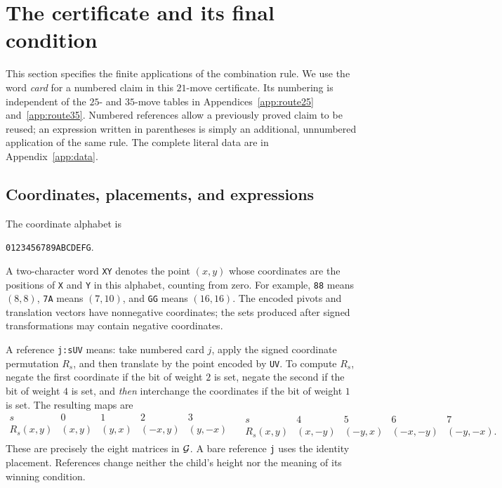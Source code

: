 \section{The certificate and its final condition}\label{sec:certificate}

This section specifies the finite applications of the combination
rule. We use the word \emph{card} for a numbered claim in this
$21$-move certificate. Its numbering is independent of the $25$- and
$35$-move tables in Appendices~\ref{app:route25} and~\ref{app:route35}. Numbered references allow a previously proved claim to
be reused; an expression written in parentheses is simply an
additional, unnumbered application of the same rule.
The complete literal data are in Appendix~\ref{app:data}.

\subsection{Coordinates, placements, and expressions}

The coordinate alphabet is
\begin{center}
\texttt{0123456789ABCDEFG}.
\end{center}
A two-character word \texttt{XY} denotes the point $(x,y)$ whose
coordinates are the positions of \texttt{X} and \texttt{Y} in this
alphabet, counting from zero. For example, \texttt{88} means $(8,8)$,
\texttt{7A} means $(7,10)$, and \texttt{GG} means $(16,16)$.
The encoded pivots and translation vectors have nonnegative
coordinates; the sets produced after signed transformations may
contain negative coordinates.

A reference \texttt{j:sUV} means: take numbered card $j$, apply the
signed coordinate permutation $R_s$, and then translate by the point
encoded by \texttt{UV}. To compute $R_s$, negate the first coordinate
if the bit of weight $2$ is set, negate the second if the bit of
weight $4$ is set, and \emph{then} interchange the coordinates if the
bit of weight $1$ is set. The resulting maps are
\begin{equation}\label{eq:symmetries}
\begin{array}{c|cccc}
 s&0&1&2&3\\ \hline
 R_s(x,y)&(x,y)&(y,x)&(-x,y)&(y,-x)\\[2pt]
\end{array}
\quad
\begin{array}{c|cccc}
 s&4&5&6&7\\ \hline
 R_s(x,y)&(x,-y)&(-y,x)&(-x,-y)&(-y,-x).
\end{array}
\end{equation}
These are precisely the eight matrices in $\mathcal G$.
A bare reference \texttt{j} uses the identity placement.
References change neither the child's height nor the meaning of its
winning condition.

